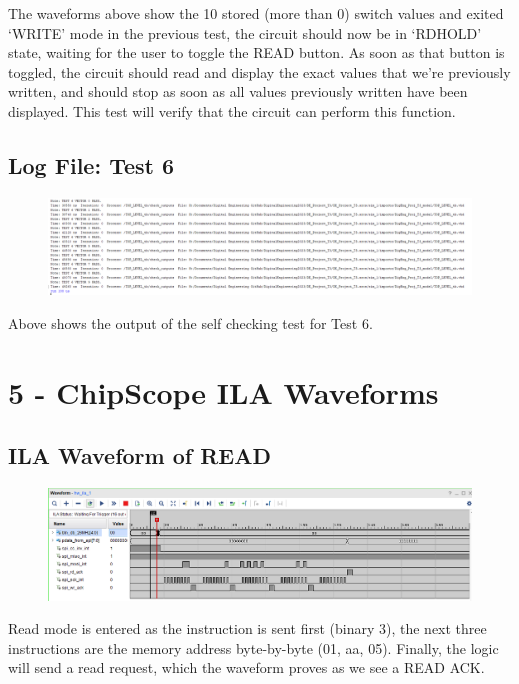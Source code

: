 \documentclass[11pt]{report}
\begin{document}
The waveforms above show  the 10 stored (more than 0) switch values and exited `WRITE' mode in the previous test, the circuit should now be in `RDHOLD' state, waiting for the user to toggle the READ button. As soon as that button is toggled, the circuit should read and display the exact values that we're previously written, and should stop as soon as all values previously written have been displayed. This test will verify that the circuit can perform this function.

\subsection*{Log File: Test 6}
\begin{figure}[H]
    \includegraphics[width=\columnwidth]{Reports/Proj/Task3/Assets/Test6Console.PNG}
\end{figure}

Above shows the output of the self checking test for Test 6.

\section*{5 - ChipScope ILA Waveforms}

\subsection*{ILA Waveform of READ}
\begin{figure}[H]
    \includegraphics[width=\columnwidth]{Reports/Proj/Task3/Assets/ILA_read.PNG}
\end{figure}

Read mode is entered as the instruction is sent first (binary 3), the next three instructions are the memory address byte-by-byte (01, aa, 05). Finally, the logic will send a read request, which the waveform proves as we see a READ ACK.
\end{document}
